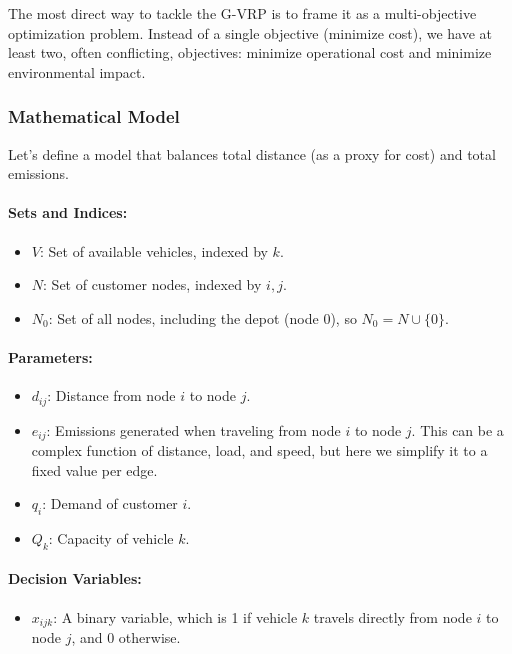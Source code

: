 \documentclass{article}
\begin{document}
The most direct way to tackle the G-VRP is to frame it as a multi-objective optimization problem. Instead of a single objective (minimize cost), we have at least two, often conflicting, objectives: minimize operational cost and minimize environmental impact.

\subsubsection{Mathematical Model}

Let's define a model that balances total distance (as a proxy for cost) and total emissions.

\paragraph{Sets and Indices:}
\begin{itemize}
    \item $V$: Set of available vehicles, indexed by $k$.
    \item $N$: Set of customer nodes, indexed by $i, j$.
    \item $N_0$: Set of all nodes, including the depot (node 0), so $N_0 = N \cup \{0\}$.
\end{itemize}

\paragraph{Parameters:}
\begin{itemize}
    \item $d_{ij}$: Distance from node $i$ to node $j$.
    \item $e_{ij}$: Emissions generated when traveling from node $i$ to node $j$. This can be a complex function of distance, load, and speed, but here we simplify it to a fixed value per edge.
    \item $q_i$: Demand of customer $i$.
    \item $Q_k$: Capacity of vehicle $k$.
\end{itemize}

\paragraph{Decision Variables:}
\begin{itemize}
    \item $x_{ijk}$: A binary variable, which is 1 if vehicle $k$ travels directly from node $i$ to node $j$, and 0 otherwise.
\end{itemize}
\end{document}
